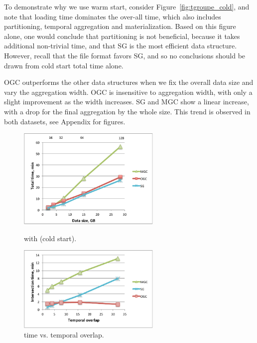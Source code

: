 To demonstrate why we use warm start, consider
Figure~\ref{fig:tgroupe_cold}, and note that loading time dominates
the over-all time, which also includes partitioning, temporal
aggregation and materialization.  Based on this figure alone, one
would conclude that partitioning is not beneficial, because it takes
additional non-trivial time, and that SG is the most efficient data
structure.  However, recall that the file format favors SG, and so no
conclusions should be drawn from cold start total time alone.

OGC outperforms the other data structures when we fix the overall data
size and vary the aggregation width.  OGC is insensitive to aggregation
width, with only a slight improvement as the width increases.  SG and
MGC show a linear increase, with a drop for the final aggregation by
the whole size.  This trend is observed in both datasets, see Appendix
for figures.

\begin{figure}
\begin{minipage}{3in}
  \centering
  \includegraphics[width=2.7in]{figs/tgroupe_cold.pdf}
\vspace{-0.1in}
  \caption{ with  (cold start).}
\label{fig:tgroupe_cold}
\vspace{-0.1in}
\end{minipage}
\begin{minipage}{3in}
  \centering
\includegraphics[width=2.7in]{figs/tand_all_warm.pdf}
\vspace{-0.1in}
\caption{ time vs. temporal overlap.}
\label{fig:tandall}
\vspace{-0.1in}
\end{minipage}
\end{figure}

